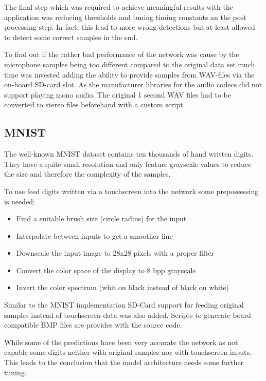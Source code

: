 \documentclass[oneside]{tum-book}
\begin{document}
The final step which was required to achieve meaningful results with the application was reducing thresholds and tuning timing constants an the post processing step. In fact, this lead to more wrong detections but at least allowed to detect some correct samples in the end.

To find out if the rather bad performance of the network was cause by the microphone samples being too different compared to the original data set much time was invested adding the ability to provide samples from WAV-files via the on-board SD-card slot. As the manufacturer libraries for the audio codecs did not support playing mono audio. The original 1 second WAV files had to be converted to stereo files beforehand with a custom script.

\subsection{MNIST}

The well-known MNIST dataset contains ten thousands of hand written digits. They have a quite small resolution and only feature grayscale values to reduce the size and therefore the complexity of the samples.

To use feed digits written via a touchscreen into the network some prepossessing is needed:

\begin{itemize}
    \item Find a suitable brush size (circle radius) for the input
    \item Interpolate between inputs to get a smoother line
    \item Downscale the input image to 28x28 pixels with  a proper filter
    \item Convert the color space of the display to 8 bpp grayscale
    \item Invert the color spectrum (whit on black instead of black on white)
\end{itemize}

Similar to the MNIST implementation SD-Card support for feeding original samples instead of touchscreen data was also added. Scripts to generate board-compatible BMP files are provides with the source code. 

While some of the predictions have been very accurate the network as not capable some digits neither with original samples nor with touchscreen inputs. This leads to the conclusion that the model architecture needs some further tuning.
\end{document}
